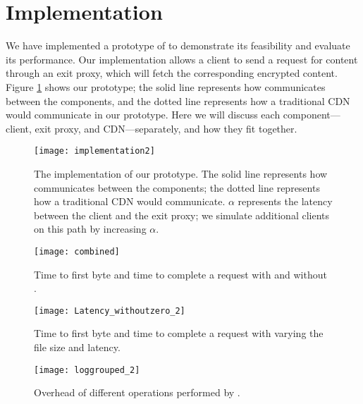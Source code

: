 \section{Implementation}
\label{sec:implementation}

We have implemented a prototype of \system{} to demonstrate its feasibility and 
evaluate its performance.  Our implementation allows a client to send a request 
for content through an exit proxy, which will fetch the corresponding 
encrypted content.  Figure \ref{fig:impl} shows our prototype; the solid line represents
how \system{} communicates between the components, and the dotted line represents how 
a traditional CDN would communicate in our prototype.  Here we will discuss each component---client, exit proxy, 
and CDN---separately, and how they fit together.

\begin{figure}[t]
\centering
\texttt{[image: implementation2]}
\caption{The implementation of our \system{} prototype.  The solid line represents
how \system{} communicates between the components; the dotted line represents how 
a traditional CDN would communicate. $\alpha$ represents the latency between the client 
and the exit proxy; we simulate additional clients on this path by increasing $\alpha$.}
\label{fig:impl}
\end{figure}
\begin{figure*}[t!]
  \begin{minipage}[t]{.31\linewidth}
    \centering
     \texttt{[image: combined]}
    \caption{Time to first byte and time to complete a request with and without \system{}.}
    \label{fig:completion}
  \end{minipage}
  \hfill
  \begin{minipage}[t]{.29\linewidth}
    \centering
    \texttt{[image: Latency\_withoutzero\_2]}
    \caption{Time to first byte and time to complete a request with varying the file size and latency.}%
    \label{fig:latency}
  \end{minipage}
  \hfill
  \begin{minipage}[t]{.35\linewidth}
    \centering
    \texttt{[image: loggrouped\_2]}
\caption{Overhead of different operations performed by \system{}.}
\label{fig:overhead2}
  \end{minipage}
\end{figure*}


